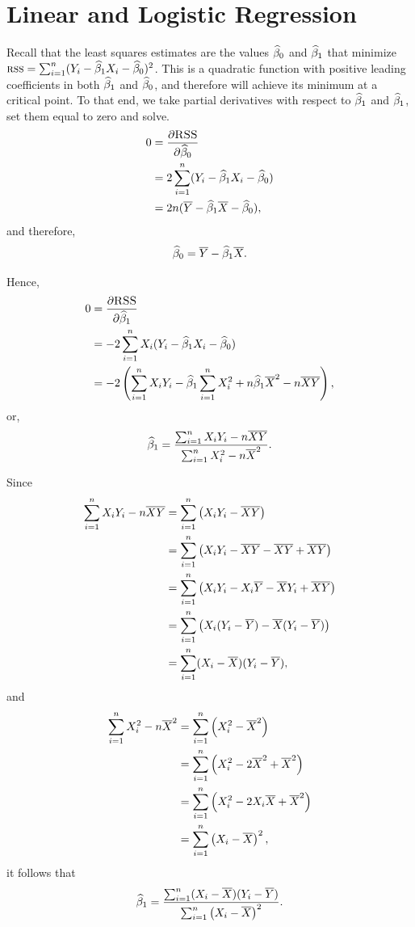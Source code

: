 \chapter{Linear and Logistic Regression}

\begin{ex}
  Recall that the least squares estimates are the values $\widehat{\beta}_0$ and
  $\widehat{\beta}_1$ that minimize
  $\textsc{rss}=\sum_{i=1}^n(Y_i-\widehat{\beta}_1X_i-\widehat{\beta}_0)^2$. This is a
  quadratic function with positive leading coefficients in both $\widehat{\beta}_1$ and
  $\widehat{\beta}_0$, and therefore will achieve its minimum at a critical point. To
  that end, we take partial derivatives with respect to $\widehat{\beta}_1$ and
  $\widehat{\beta}_1$, set them equal to zero and solve.
  \begin{align*}
    0 & =\frac{\partial{\textsc{RSS}}}{\partial \widehat{\beta}_0}    \\
      & =2\sum_{i=1}^n(Y_i-\widehat{\beta}_1X_i-\widehat{\beta}_0) \\
      & =2n(\overline{Y}-\widehat{\beta}_1\overline{X}-\widehat{\beta}_0),
  \end{align*}
  and therefore,
  \[
    \widehat{\beta}_0 = \overline{Y}-\widehat{\beta}_1\overline{X}.
  \]

  Hence,
  \begin{align*}
    0 & =\frac{\partial{\textsc{RSS}}}{\partial \widehat{\beta}_1}               \\
      & =-2\sum_{i=1}^nX_i(Y_i-\widehat{\beta}_1X_i-\widehat{\beta}_0)        \\
      & =-2\left(\sum_{i=1}^nX_iY_i-\widehat{\beta}_1\sum_{i=1}^nX^2_i
    +n\widehat{\beta}_1\overline{X}^2-n\overline{X}\overline{Y}\right),
  \end{align*}
  or,
  \[
    \widehat{\beta}_1=\frac{\sum_{i=1}^nX_iY_i-n\overline{X}\overline{Y}}{\sum_{i=1}^nX_i^2-n\overline{X}^2}.
  \]

  Since
  \begin{align*}
    \sum_{i=1}^nX_iY_i-n\overline{X}\overline{Y}
     & =\sum_{i=1}^n\left(X_iY_i-\overline{X}\overline{Y}\right)                       \\
     & =\sum_{i=1}^n\left(X_iY_i-\overline{X}\overline{Y}-\overline{X}\overline{Y}+\overline{X}\overline{Y}\right) \\
     & =\sum_{i=1}^n\left(X_iY_i-X_i\overline{Y}-\overline{X} Y_i+\overline{X}\overline{Y}\right)    \\
     & =\sum_{i=1}^n\left(X_i(Y_i-\overline{Y})-\overline{X}(Y_i-\overline{Y})\right)         \\
     & =\sum_{i=1}^n(X_i-\overline{X})(Y_i-\overline{Y}),
  \end{align*}
  and
  \begin{align*}
    \sum_{i=1}^nX_i^2-n\overline{X}^2
     & =\sum_{i=1}^n\left(X_i^2-\overline{X}^2\right)           \\
     & =\sum_{i=1}^n\left(X_i^2-2\overline{X}^2+\overline{X}^2\right)  \\
     & =\sum_{i=1}^n\left(X_i^2-2X_i\overline{X}+\overline{X}^2\right) \\
     & =\sum_{i=1}^n\left(X_i-\overline{X}\right)^2,
  \end{align*}
  it follows that
  \[
    \widehat{\beta}_1
    =\frac{\sum_{i=1}^n(X_i-\overline{X})(Y_i-\overline{Y})}{\sum_{i=1}^n\left(X_i-\overline{X}\right)^2}.
  \]


\end{ex}

